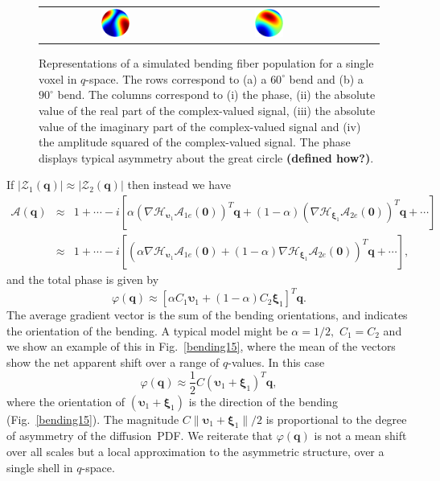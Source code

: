 \documentclass[authoryear,preprint,12pt]{elsarticle}
\newcommand{\q}{\mathbf{q}}
\newcommand{\bsu}{\bs{\upsilon}}
\newcommand{\cA}{\mathcal{A}}
\newcommand{\cH}{\mathcal{H}}
\newcommand{\cZ}{\mathcal{Z}}
\newcommand{\bld}[1]{\mathbf{#1}}
\newcommand{\bs}[1]{\boldsymbol{#1}}
\begin{document}
\begin{figure}[!htbp]
\begin{center}
\begin{tabular}{c|cccc}
      \includegraphics[width=0.2\textwidth]{try3290ny.ps} & 
      \includegraphics[width=0.2\textwidth]{try3390ny.ps}
    \end{tabular}
  \end{center}
  \caption{Representations of a simulated bending fiber population for
    a single voxel in $q$-space.  The rows correspond to (a) a
    $60^{\circ}$ bend and (b) a $90^{\circ}$ bend.  The columns
    correspond to (i) the phase, (ii) the absolute value of the real
    part of the complex-valued signal, (iii) the absolute value of the
    imaginary part of the complex-valued signal and (iv) the amplitude
    squared of the complex-valued signal.  The phase displays typical
    asymmetry about the great circle \textbf{(defined how?)}.}
  \label{bending}
\end{figure}

If $|\cZ_1(\q)|\approx|\cZ_2(\q)|$ then instead we have 
\begin{eqnarray}
  \cA(\q)&\approx & 1 + \cdots - i
  \left[\alpha\left(\nabla\cH_{\bsu_1}\cA_{1e}(\bld{0})\right)^T\q
  + (1-\alpha)
  \left(\nabla\cH_{\bs\xi_1}\cA_{2e}(\bld{0})\right)^T\q +
  \cdots\right] \nonumber\\
  &\approx& 1 + \cdots - i
  \left[\left(\alpha\nabla\cH_{\bsu_1}\cA_{1e}(\bld{0}) +
  (1-\alpha) \nabla\cH_{\bs\xi_1}\cA_{2e}(\bld{0})\right)^T\q +
  \cdots\right],
\end{eqnarray}
and the total phase is given by
\begin{equation}
  \varphi(\q) \approx \left[\alpha C_1\bsu_1 + (1-\alpha) C_2
  \bs\xi_1\right]^T\q.
\end{equation}
The average gradient vector is the sum of the bending orientations,
and indicates the orientation of the bending.  A typical model might
be $\alpha=1/2,$ $C_1=C_2$ and we show an example of this in
Fig.~\ref{bending15}, where the mean of the vectors show the net
apparent shift over a range of $q$-values.  In this case
\begin{equation}
  \varphi(\q) \approx \frac{1}{2}C\left(\bsu_1 + \bs\xi_1\right)^T\q,
\end{equation}
where the orientation of $(\bsu_1+\bs\xi_1)$ is the direction of the
bending (Fig.~\ref{bending15}).  The magnitude
$C\|\bsu_1+\bs\xi_1\|/2$ is proportional to the degree of asymmetry of
the diffusion~PDF.  We reiterate that $\varphi(\q)$ is not a mean
shift over all scales but a local approximation to the asymmetric
structure, over a single shell in $q$-space.
\end{document}
